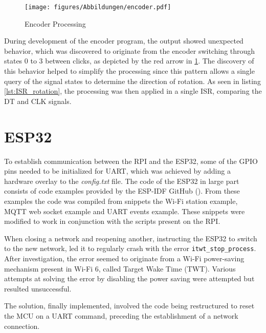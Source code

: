 \begin{figure}[h]
   \texttt{[image: figures/Abbildungen/encoder.pdf]} 
   \centering
   \caption{Encoder Processing}
   \label{fig:encoder_processing}
\end{figure}

During development of the encoder program, the output showed unexpected behavior, which was discovered to originate from the encoder switching through states 0 to 3 between clicks, as depicted by the red arrow in \cref{fig:encoder_processing}.
The discovery of this behavior helped to simplify the processing since this pattern allows a single query of the signal states to determine the direction of rotation.
As seen in listing \ref{lst:ISR_rotation}, the processing was then applied in a single ISR, comparing the DT and CLK signals.

\section{ESP32}
To establish communication between the RPI and the ESP32, some of the GPIO pins needed to be initialized for UART, which was achieved by adding a hardware overlay to the \textit{config.txt} file.
The code of the ESP32 in large part consists of code examples provided by the ESP-IDF GitHub (\cite{espidf}).
From these examples the code was compiled from snippets the Wi-Fi station example, MQTT web socket example and UART events example.
These snippets were modified to work in conjunction with the scripts present on the RPI.

When closing a network and reopening another, instructing the ESP32 to switch to the new network, led it to regularly crash with the error \lstinline[]|itwt_stop_process|.
After investigation, the error seemed to originate from a Wi-Fi power-saving mechanism present in Wi-Fi 6, called Target Wake Time (TWT).
Various attempts at solving the error by disabling the power saving were attempted but resulted unsuccessful.

The solution, finally implemented, involved the code being restructured to reset the MCU on a UART command, preceding the establishment of a network connection.

